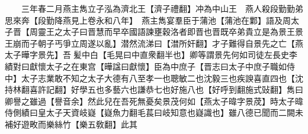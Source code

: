 　　三年春二月燕主雋立子泓為濟北王【濟子禮翻】冲為中山王　燕人殺段勤勤弟思來奔【段勤降燕見上卷永和八年】　燕主雋宴羣臣于蒲池【蒲池在鄴】語及周太子晋【周靈王之太子曰晋慧而早卒國語諫壅穀洛者即晋也晋既卒弟貴立是為景王景王崩而子朝子丐爭立周遂以亂】潜然流涕曰【澘所奸翻】才子難得自景先之亡【燕太子曄字景先】吾髪中白【毛晃曰中直衆翻半也】卿等謂景先何如司徒左長史李績對曰獻懷太子之在東宫【曄諡曰獻懷】臣為中庶子【晋志曰太子中庶子職如侍中】太子志業敢不知之太子大德有八至孝一也聰敏二也沈毅三也疾諛喜直四也【沈持林翻喜許記翻】好學五也多藝六也謙恭七也好施八也【好呼到翻施式䜴翻】雋曰卿譽之雖過【譽音余】然此兒在吾死無憂矣景茂何如【燕太子暐字景荗】時太子暐侍側績曰皇太子天資岐嶷【嶷魚力翻毛萇曰岐知意也嶷識也】雖八德已聞而二闕未補好遊畋而樂絲竹【樂五敎翻】此其
